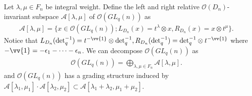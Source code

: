 \documentclass[table,a4paper,reqno]{amsart}
\numberwithin{equation}{section}
\theoremstyle{definition}
\begin{document}
Let $\lambda,\mu\in F_n$ be integral weight. Define the left and right relative $\mathcal{O}(D_n)$-invariant subspace $\mathcal{A}[\lambda,\mu]$ of $\mathcal{O}(GL_q(n))$ as
\begin{align}\label{eq:3.1}
    \mathcal{A}[\lambda,\mu]=\{x\in \mathcal{O}(GL_q(n)); L_{D_n}(x)=t^\lambda\otimes x, R_{D_n}(x)=x\otimes t^\mu\}.
\end{align}
Notice that $L_{D_n}(\text{det}_q^{-1})=t^{-\vv{1}}\otimes \text{det}_q^{-1}, R_{D_n}(\text{det}_q^{-1})=\text{det}_q^{-1}\otimes t^{-\vv{1}}$ where $-\vv{1}=-\epsilon_1-\cdots-\epsilon_n$. We can decompose $\mathcal{O}(GL_q(n))$ as 
\begin{align}\label{eq:3.2}
    \mathcal{O}(GL_q(n))=\bigoplus_{\lambda,\mu\in F_n}\mathcal{A}[\lambda,\mu].
\end{align}
and $\mathcal{O}(GL_q(n))$ has a grading structure induced by $\mathcal{A}[\lambda_1,\mu_1]\cdot\mathcal{A}[\lambda_2,\mu_2]\subset\mathcal{A}[\lambda_1+\lambda_2,\mu_1+\mu_2]$. 
\end{document}
